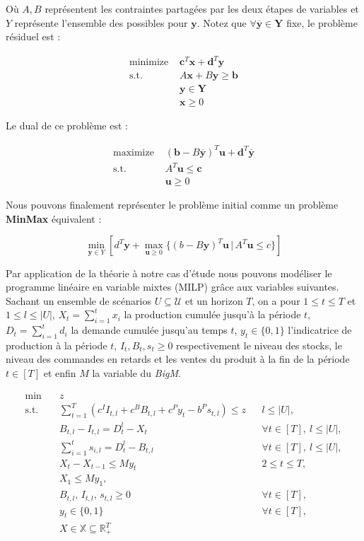 \documentclass[12pt, a4paper, twoside]{report}
\numberwithin{equation}{section}
\newcommand{\mmx}{\textbf{MinMax} }
\begin{document}
	Où $A, B$ représentent les contraintes partagées par les deux étapes de variables et $Y$ représente l'ensemble des possibles pour $\mathbf{y}$. Notez que $\forall \overline{\mathbf{y}}\in \mathbf{Y}$ fixe, le problème résiduel est :
	
	\begin{align}
		\text{minimize}\,\,&\mathbf{c}^T\mathbf{x}+\mathbf{d}^T\mathbf{y}\\
		\text{s.t.}    \,\,&A\mathbf{x}+B\mathbf{y}\geq \mathbf{b}\\
		&\mathbf{y}\in \mathbf{Y}\\
		&\mathbf{x}\geq0
	\end{align}
	
	Le dual de ce problème est :
	
	\begin{align}
		\text{maximize}\,\,&(\mathbf{b}-B\overline{\mathbf{y}})^T\mathbf{u}+\mathbf{d}^T\overline{\mathbf{y}}\\
		\text{s.t.}    \,\,&A^T\mathbf{u}\leq\mathbf{c}\\
		&\mathbf{u}\geq0
	\end{align}
	
	Nous pouvons finalement représenter le problème initial comme un problème \mmx équivalent :
	
	\begin{equation}
		\min_{\mathbf{y}\in Y}[d^T\mathbf{y}+\max_{\mathbf{u}\geq0}\{(b-B\mathbf{y})^T\mathbf{u}\,|\, A^T\mathbf{u}\leq c\}]
	\end{equation}
	
	Par application de la théorie à notre cas d'étude nous pouvons modéliser le programme linéaire en variable mixtes (MILP) grâce aux variables suivantes. Sachant un ensemble de scénarios $U\subseteq\mathcal{U}$ et un horizon $T$, on a pour $1\leq t\leq T$ et $1\leq l\leq |U|$, $X_t=\sum_{i=1}^{t}x_i$ la production cumulée jusqu'à la période $t$, $D_t=\sum_{i=1}^{t}d_i$ la demande cumulée jusqu'au temps $t$, $y_t\in\{0, 1\}$ l'indicatrice de production à la période $t$, $I_t, B_t, s_t \geq 0$ respectivement le niveau des stocks, le niveau des commandes en retards et les ventes du produit à la fin de la période $t\in[T]$ et enfin $M$ la variable du \textit{BigM}.
	
	\begin{align}
		\min\quad & z \\
		\text{s.t.}\quad & \sum_{t=1}^{T}\left(c^I I_{t,l} + c^B B_{t,l} + c^P y_t - b^P s_{t,l}\right) \le z && l\le |U|,\\
		& B_{t,l}-I_{t,l}=D_t^l-X_t && \forall t\in[T],\ l\le |U|,\\
		& \sum_{i=1}^{t}s_{i,l}=D_t^l-B_{t,l} && \forall t\in[T],\ l\le |U|,\\
		& X_t-X_{t-1}\le My_t && 2\le t\le T,\\
		& X_1\le My_1,\\
		& B_{t,l},\,I_{t,l},\,s_{t,l}\ge0 && \forall t\in[T],\\
		& y_t\in\{0,1\} && \forall t\in[T],\\
		& X\in\mathbb{X}\subseteq\mathbb{R}_+^T
	\end{align}
	
\end{document}
